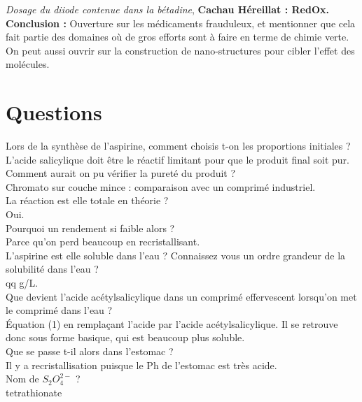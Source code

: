 \documentclass[12pt,prb,aps,epsf]{article}
\begin{document}
\textit{Dosage du diiode contenue dans la bétadine}, \textbf{Cachau Héreillat : RedOx.}\\

\textbf{Conclusion :} Ouverture sur les médicaments frauduleux, et mentionner que cela fait partie des domaines où de gros efforts sont à faire en terme de chimie verte.\\
On peut aussi ouvrir sur la construction de nano-structures pour cibler l'effet des molécules.

\section*{Questions}
Lors de la synthèse de l'aspirine, comment choisis t-on les proportions initiales ?\\
L'acide salicylique doit être le réactif limitant pour que le produit final soit pur.\\

Comment aurait on pu vérifier la pureté du produit ?\\
Chromato sur couche mince : comparaison avec un comprimé industriel.\\

La réaction est elle totale en théorie ?\\
Oui.\\

Pourquoi un rendement si faible alors ?\\
Parce qu'on perd beaucoup en recristallisant.\\

L'aspirine est elle soluble dans l'eau ? Connaissez vous un ordre grandeur de la solubilité dans l'eau ?\\
qq g/L.\\

Que devient l'acide acétylsalicylique dans un comprimé effervescent lorsqu'on met le comprimé dans l'eau ?\\
Équation (1) en remplaçant l'acide par l'acide acétylsalicylique. Il se retrouve donc sous forme basique, qui est beaucoup plus soluble.\\

Que se passe t-il alors dans l'estomac ?\\
Il y a recristallisation puisque le Ph de l'estomac est très acide.\\

Nom de $S_2O_4^{2-}$ ?\\
tetrathionate\\
\end{document}
